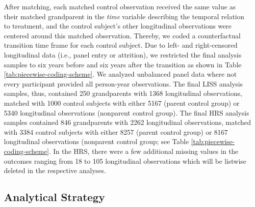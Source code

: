 \documentclass[
  english,
  man, noextraspace]{apa7}
\begin{document}
After matching, each matched control observation received the same value as their matched grandparent in the \emph{time} variable describing the temporal relation to treatment, and the control subject's other longitudinal observations were centered around this matched observation. Thereby, we coded a counterfactual transition time frame for each control subject. Due to left- and right-censored longitudinal data (i.e., panel entry or attrition), we restricted the final analysis samples to six years before and six years after the transition as shown in Table \ref{tab:piecewise-coding-scheme}. We analyzed unbalanced panel data where not every participant provided all person-year observations. The final LISS analysis samples, thus, contained 250 grandparents with 1368 longitudinal observations, matched with 1000 control subjects with either 5167 (parent control group) or 5340 longitudinal observations (nonparent control group). The final HRS analysis samples contained 846 grandparents with 2262 longitudinal observations, matched with 3384 control subjects with either 8257 (parent control group) or 8167 longitudinal observations (nonparent control group; see Table \ref{tab:piecewise-coding-scheme}. In the HRS, there were a few additional missing values in the outcomes ranging from 18 to 105 longitudinal observations which will be listwise deleted in the respective analyses.

\hypertarget{analytical-strategy}{%
\subsection{Analytical Strategy}\label{analytical-strategy}}
\end{document}
